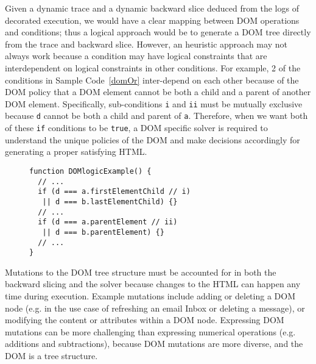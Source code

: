 Given a dynamic trace and a dynamic backward slice deduced from the logs of decorated execution, we would have a clear mapping between DOM operations and conditions; thus a logical approach would be to generate a DOM tree directly from the trace and backward slice.  
However, an heuristic approach may not always work because a condition may have logical constraints that are interdependent on logical constraints in other conditions.  
For example, 2 of the conditions in Sample Code~\ref{domOr} inter-depend on each other because of the DOM policy that a DOM element cannot be both a child and a parent of another DOM element.  
Specifically, sub-conditions {\tt i} and {\tt ii} must be mutually exclusive because {\tt d} cannot be both a child and parent of {\tt a}.
Therefore, when we want both of these {\tt if} conditions to be {\tt true}, a DOM specific solver is required to understand the unique policies of the DOM and make decisions accordingly for generating a proper satisfying HTML.
\begin{figure}
\begin{lstlisting}[caption=Example code showing conditions that have logical constraints interdependent with each other.,label=domOr]  
function DOMlogicExample() {
  // ...
  if (d === a.firstElementChild // i)
   || d === b.lastElementChild) {}
  // ... 
  if (d === a.parentElement // ii)
   || d === b.parentElement) {}
  // ...
}
\end{lstlisting}
\end{figure}


Mutations to the DOM tree structure must be accounted for in both the backward slicing and the solver because changes to the HTML can happen any time during execution.
Example mutations include adding or deleting a DOM node (e.g. in the use case of refreshing an email Inbox or deleting a message), or modifying the content or attributes within a DOM node.  
Expressing DOM mutations can be more challenging than expressing numerical operations (e.g. additions and subtractions), because DOM mutations are more diverse, and the DOM is a tree structure.
